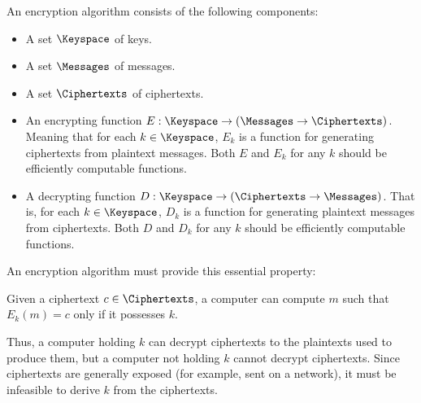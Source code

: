 An encryption algorithm consists of the following components:
\begin{itemize}[noitemsep]
\item A set $\Keyspace$ of keys.
\item A set $\Messages$ of messages.
\item A set $\Ciphertexts$ of ciphertexts.
\item An encrypting function $E : \Keyspace \rightarrow (\Messages \rightarrow \Ciphertexts)$.
  Meaning that for each $k \in \Keyspace$, $E_{k}$ is a function for generating ciphertexts from plaintext messages.
  Both $E$ and $E_{k}$ for any $k$ should be efficiently computable functions.
\item A decrypting function $D : \Keyspace \rightarrow (\Ciphertexts \rightarrow \Messages)$.
  That is, for each $k \in \Keyspace$, $D_{k}$ is a function for generating plaintext messages from ciphertexts.
  Both $D$ and $D_{k}$ for any $k$ should be efficiently computable functions.
\end{itemize}

An encryption algorithm must provide this essential property:
\begin{blackbox}
Given a ciphertext $c \in \Ciphertexts$, a computer can compute $m$ such that $E_{k}(m) = c$ only if it possesses $k$.
\end{blackbox}

Thus, a computer holding $k$ can decrypt ciphertexts to the plaintexts used to produce them, but a computer not holding $k$ cannot decrypt ciphertexts.
Since ciphertexts are generally exposed (for example, sent on a network), it must be infeasible to derive $k$ from the ciphertexts.



